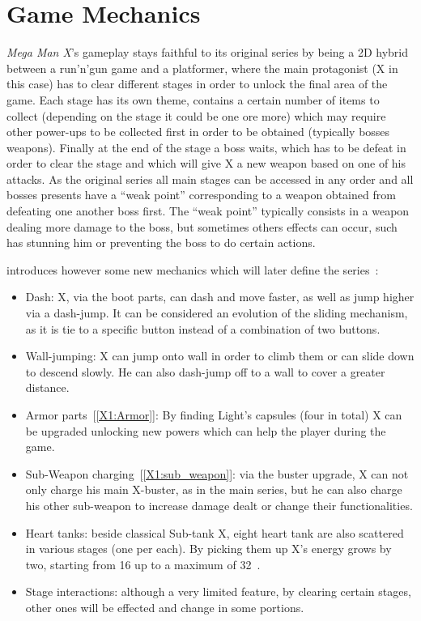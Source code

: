 \section{Game Mechanics}
\textit{Mega Man X}'s gameplay stays faithful to its original series by being a 2D hybrid between a run'n'gun game and a platformer, where the main protagonist (X in this case) has to clear different stages in order to unlock the final area of the game. Each stage has its own theme, contains a certain number of items to collect (depending on the stage it could be one ore more) which may require other power-ups to be collected first in order to be obtained (typically bosses weapons). Finally at the end of the stage a boss waits, which has to be defeat in order to clear the stage and which will give X a new weapon based on one of his attacks. As the original series all main stages can be accessed in any order and all bosses presents have a ``weak point'' corresponding to a weapon obtained from defeating one another boss first. The ``weak point'' typically consists in a weapon dealing more damage to the boss, but sometimes others effects can occur, such has stunning him or preventing the boss to do certain actions.

\x introduces however some new mechanics which will later define the series~\cite{wiki:X1_features}:
\begin{itemize}
	\item Dash: X, via the boot parts, can dash and move faster, as well as jump higher via a dash-jump. It can be considered an evolution of the sliding mechanism, as it is tie to a specific button instead of a combination of two buttons.
	\item Wall-jumping: X can jump onto wall in order to climb them or can slide down to descend slowly. He can also dash-jump off to a wall to cover a greater distance.
	\item Armor parts~[\ref{X1:Armor}]: By finding Light's capsules (four in total) X can be upgraded unlocking new powers which can help the player during the game.
	\item Sub-Weapon charging~[\ref{X1:sub_weapon}]: via the buster upgrade, X can not only charge his main X-buster, as in the main series, but he can also charge his other sub-weapon to increase damage dealt or change their functionalities.
	\item Heart tanks: beside classical Sub-tank X, eight heart tank are also scattered in various stages (one per each). By picking them up X's energy grows by two, starting from 16 up to a maximum of 32~\cite{stratwiki:Heart_tank}.
	\item Stage interactions: although a very limited feature, by clearing certain stages, other ones will be effected and change in some portions.
\end{itemize}

